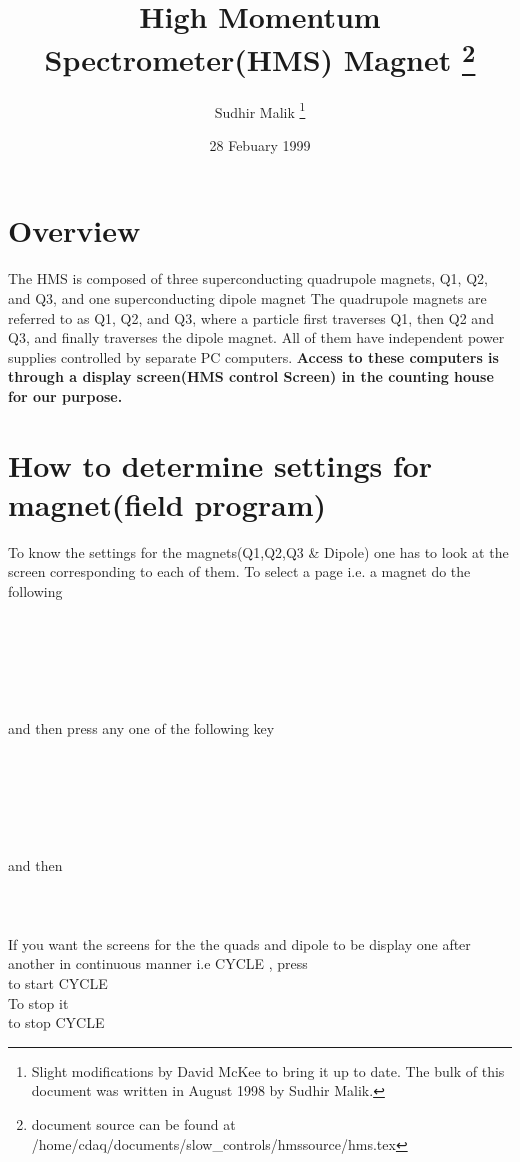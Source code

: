 \documentclass[12pt,epsf,here]{article}
\newcommand{\h}{\hspace*{1 in}}
\begin{document}
\title{High Momentum Spectrometer(HMS) Magnet
\footnote{document source can be found at 
/home/cdaq/documents/slow\_controls/hmssource/hms.tex} }
\author{Sudhir Malik
\footnote{Slight modifications by David McKee to bring it up to date.
The bulk of this document was written in August 1998 by Sudhir Malik.}
}
\date{28 Febuary 1999}
\maketitle
\section{Overview}

The HMS is composed of three superconducting quadrupole magnets, Q1, Q2,
and Q3, and one superconducting dipole magnet The quadrupole magnets are
referred to as Q1, Q2, and Q3, where a particle first traverses Q1, then Q2
and Q3, and finally traverses the dipole magnet.  All of them have
independent power supplies controlled by separate PC computers.\textbf{
Access to these computers is through a display screen(HMS control Screen)
in the counting house for our purpose.}


\section{How to determine settings for magnet(field program)}

To know the settings for the magnets(Q1,Q2,Q3 \& Dipole) one has to look
at the screen corresponding to each of them. To select a page i.e. a
magnet do the following \\
\\
\h{Press and hold "Num lock"}\\
\h{Press and hold "minus(-)"}\\
\h{Release        "minus(-)}\\
\h{Release        "Num lock"}\\
\\
and then press any one of the following key\\
\\
\h{"A" for Q1}\\
\h{"B" for Q2}\\
\h{"C" for Q3}\\
\h{"D" for Q4}\\
\\
and then\\
\\
\h{Press "Return"}\\
\\
If you want the screens for the the quads and dipole to be display one
after another in continuous manner i.e CYCLE , press
\\
\h{"KG"} to start CYCLE
\\
To stop it
\\
\h{"KH"} to stop CYCLE
\end{document}
